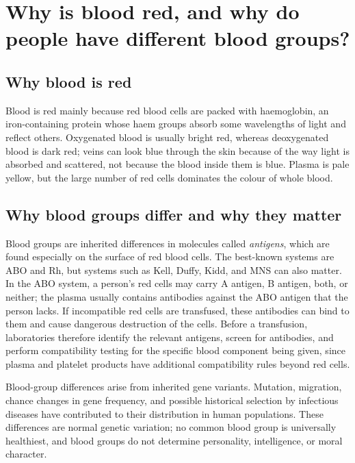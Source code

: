 \documentclass[11pt,oneside]{report}
\begin{document}
\section{Why is blood red, and why do people have different blood groups?}

\subsection*{Why blood is red}

Blood is red mainly because red blood cells are packed with haemoglobin, an
iron-containing protein whose haem groups absorb some wavelengths of light and
reflect others. Oxygenated blood is usually bright red, whereas deoxygenated
blood is dark red; veins can look blue through the skin because of the way light
is absorbed and scattered, not because the blood inside them is blue. Plasma is
pale yellow, but the large number of red cells dominates the colour of whole
blood.

\subsection*{Why blood groups differ and why they matter}

Blood groups are inherited differences in molecules called \emph{antigens},
which are found especially on the surface of red blood cells. The best-known
systems are ABO and Rh, but systems such as Kell, Duffy, Kidd, and MNS can also
matter. In the ABO system, a person's red cells may carry A antigen, B antigen,
both, or neither; the plasma usually contains antibodies against the ABO antigen
that the person lacks. If incompatible red cells are transfused, these
antibodies can bind to them and cause dangerous destruction of the cells.
Before a transfusion, laboratories therefore identify the relevant antigens,
screen for antibodies, and perform compatibility testing for the specific blood
component being given, since plasma and platelet products have additional
compatibility rules beyond red cells.

Blood-group differences arise from inherited gene variants. Mutation, migration,
chance changes in gene frequency, and possible historical selection by infectious
diseases have contributed to their distribution in human populations. These
differences are normal genetic variation; no common blood group is universally
healthiest, and blood groups do not determine personality, intelligence, or
moral character.
\end{document}
